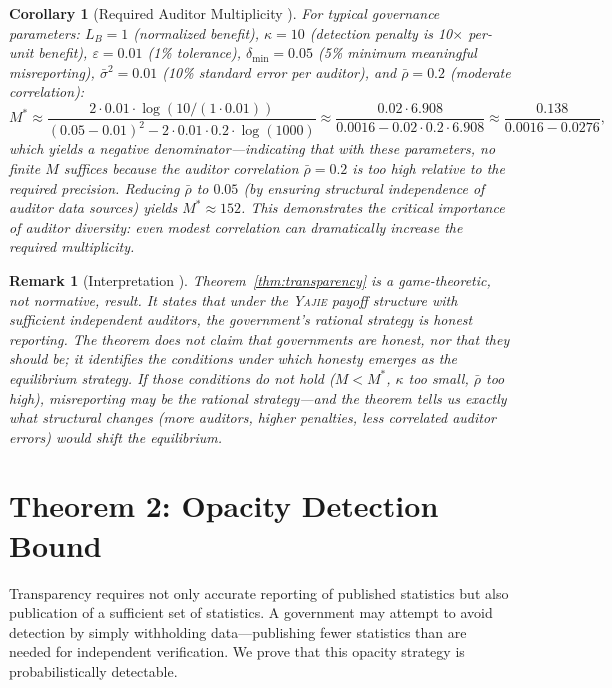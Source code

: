 \documentclass[11pt,a4paper]{article}
\newtheorem{corollary}[theorem]{Corollary}
\newtheorem{remark}[theorem]{Remark}
\theoremstyle{definition}
\newcommand{\Yajie}{\textsc{Yajie}}
\begin{document}
\begin{corollary}[Required Auditor Multiplicity ]
\label{cor:required_M}
For typical governance parameters: $L_B = 1$ (normalized benefit), $\kappa = 10$ (detection penalty is 10$\times$ per-unit benefit), $\varepsilon = 0.01$ (1\% tolerance), $\delta_{\min} = 0.05$ (5\% minimum meaningful misreporting), $\bar{\sigma}^2 = 0.01$ (10\% standard error per auditor), and $\bar{\rho} = 0.2$ (moderate correlation):
\begin{equation}
    M^* \approx \frac{2 \cdot 0.01 \cdot \log(10 / (1 \cdot 0.01))}{(0.05 - 0.01)^2 - 2 \cdot 0.01 \cdot 0.2 \cdot \log(1000)} 
    \approx \frac{0.02 \cdot 6.908}{0.0016 - 0.02 \cdot 0.2 \cdot 6.908} \approx \frac{0.138}{0.0016 - 0.0276},
    \label{eq:M_star_example}
\end{equation}
which yields a negative denominator---indicating that with these parameters, no finite $M$ suffices because the auditor correlation $\bar{\rho} = 0.2$ is too high relative to the required precision. Reducing $\bar{\rho}$ to $0.05$ (by ensuring structural independence of auditor data sources) yields $M^* \approx 152$. This demonstrates the critical importance of auditor diversity: even modest correlation can dramatically increase the required multiplicity.
\end{corollary}
\begin{remark}[Interpretation ]
\label{rem:transparency_interpretation}
Theorem~\ref{thm:transparency} is a game-theoretic, not normative, result. It states that under the \Yajie{} payoff structure with sufficient independent auditors, the government's \textit{rational} strategy is honest reporting. The theorem does not claim that governments \textit{are} honest, nor that they \textit{should be}; it identifies the conditions under which honesty emerges as the equilibrium strategy. If those conditions do not hold ($M < M^*$, $\kappa$ too small, $\bar{\rho}$ too high), misreporting may be the rational strategy---and the theorem tells us exactly what structural changes (more auditors, higher penalties, less correlated auditor errors) would shift the equilibrium.
\end{remark}
\section{Theorem 2: Opacity Detection Bound}
\label{sec:opacity}
Transparency requires not only accurate reporting of published statistics but also publication of a sufficient set of statistics. A government may attempt to avoid detection by simply withholding data---publishing fewer statistics than are needed for independent verification. We prove that this opacity strategy is probabilistically detectable.
\end{document}

